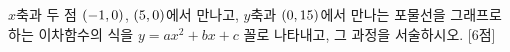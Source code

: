 $x$축과 두 점 $(-1{,}\mkern3mu 0)$, $(5{,}\mkern3mu 0)$에서 만나고, $y$축과 $(0{,}\mkern3mu 15)$에서 만나는 포물선을 그래프로 하는 이차함수의 식을 $y=ax^2+bx+c$ 꼴로 나타내고, 그 과정을 서술하시오.  \mbox{[6점]}

